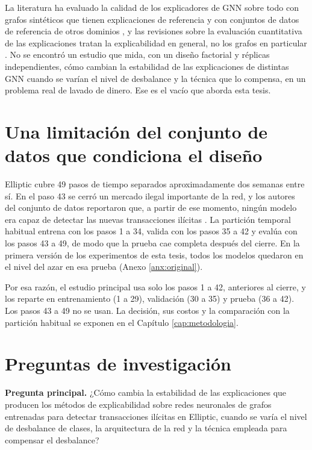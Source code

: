 La literatura ha evaluado la calidad de los explicadores de GNN sobre todo con grafos sintéticos que tienen explicaciones de referencia y con conjuntos de datos de referencia de otros dominios \cite{Agarwal2023Evaluating, Longa2024Explaining}, y las revisiones sobre la evaluación cuantitativa de las explicaciones tratan la explicabilidad en general, no los grafos en particular \cite{Nauta2023Anecdotal, Bodria2023Benchmarking}. No se
encontró un estudio que mida, con un diseño factorial y réplicas independientes, cómo cambian
la estabilidad de las explicaciones de distintas GNN cuando se varían el nivel de desbalance y
la técnica que lo compensa, en un problema real de lavado de dinero. Ese es el vacío que
aborda esta tesis.

\section{Una limitación del conjunto de datos que condiciona el diseño}

Elliptic cubre 49 pasos de tiempo separados aproximadamente dos semanas entre sí. En el paso
43 se cerró un mercado ilegal importante de la red, y los autores del conjunto de datos
reportaron que, a partir de ese momento, ningún modelo era capaz de detectar las nuevas
transacciones ilícitas \cite{Weber2019Elliptic}. La partición temporal habitual entrena con
los pasos 1 a 34, valida con los pasos 35 a 42 y evalúa con los pasos 43 a 49, de modo que la
prueba cae completa después del cierre. En la primera versión de los experimentos de esta
tesis, todos los modelos quedaron en el nivel del azar en esa prueba (Anexo
\ref{anx:original}).

Por esa razón, el estudio principal usa solo los pasos 1 a 42, anteriores al cierre, y los
reparte en entrenamiento (1 a 29), validación (30 a 35) y prueba (36 a 42). Los pasos 43 a 49
no se usan. La decisión, sus costos y la comparación con la partición habitual se exponen en
el Capítulo \ref{cap:metodologia}.

\section{Preguntas de investigación}

\textbf{Pregunta principal.} ¿Cómo cambia la estabilidad de las explicaciones que producen
los métodos de explicabilidad sobre redes neuronales de grafos entrenadas para detectar
transacciones ilícitas en Elliptic, cuando se varía el nivel de desbalance de clases, la
arquitectura de la red y la técnica empleada para compensar el desbalance?

